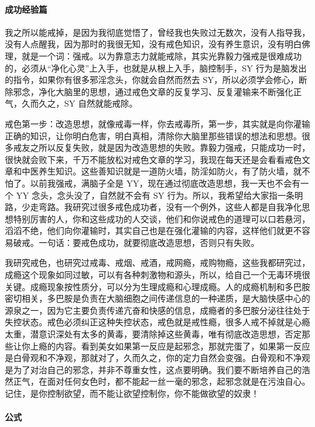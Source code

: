 \documentclass[fontset=founder]{ctexart}
\begin{document}
\paragraph{成功经验篇}

我之所以能戒掉，是因为我彻底觉悟了，曾经我也失败过无数次，没有人指导我，没有人点醒我，因为那时的我很无知，没有戒色知识，没有养生意识，没有明白佛理，就是一个词：强戒。以为靠意志力就能戒除，其实光靠毅力强戒是很难成功的，必须从“净化心灵”上入手，也就是从根上入手，脑控制手，SY 行为是脑发出的指令，如果你有很多邪淫念头，你就会自然而然去 SY，所以必须学会修心，断除邪念，净化大脑里的思想，通过戒色文章的反复学习、反复灌输来不断强化正气，久而久之，SY 自然就能戒除。

戒色第一步：改造思想，就像戒毒一样，你去戒毒所，第一步，其实就是向你灌输正确的知识，让你明白危害，明白真相，清除你大脑里那些错误的想法和思想。很多戒友之所以反复失败，就是因为改造思想的失败。靠毅力强戒，只能成功一时，很快就会败下来，千万不能放松对戒色文章的学习，我现在每天还是会看看戒色文章和中医养生知识。这些善知识就是一道防火墙，防淫如防火，有了防火墙，就不怕了。以前我强戒，满脑子全是 YY，现在通过彻底改造思想，我一天也不会有一个 YY 念头，念头没了，自然就不会有 SY 行为。所以，我希望给大家指一条明路，少走弯路。我研究过很多戒色成功者，没有一个例外，这些人都是自我净化思想特别厉害的人，你和这些成功的人交谈，他们和你说戒色的道理可以口若悬河，滔滔不绝，他们向你灌输时，其实自己也是在强化灌输的内容，这样他们就更不容易破戒。一句话：要戒色成功，就要彻底改造思想，否则只有失败。

我研究戒色，也研究过戒毒、戒烟、戒酒，戒网瘾，戒购物瘾，这些我都研究过，成瘾这个现象如同过敏，可以有各种刺激物和源头，所以，给自己一个无毒环境很关键。成瘾现象按性质分，可以分为生理成瘾和心理成瘾。人的成瘾机制和多巴胺密切相关，多巴胺是负责在大脑细胞之间传递信息的一种递质，是大脑快感中心的源泉之一，因为它主要负责传递亢奋和快感的信息，成瘾者的多巴胺分泌往往处于失控状态。戒色必须纠正这种失控状态，戒色就是戒性瘾，很多人戒不掉就是心瘾太重，潜意识深处有太多的黄毒，要清除掉这些黄毒，唯有彻底改造思想，否定那些让你上瘾的内容。看到美女如果第一反应是起邪念，那就完蛋了，如果第一反应是白骨观和不净观，那就对了，久而久之，你的定力自然会变强。白骨观和不净观是为了对治自己的邪念，并非不尊重女性，这点要明确。我们要不断培养自己的浩然正气，在面对任何女色时，都不能起一丝一毫的邪念，起邪念就是在污浊自心。记住，是你控制欲望，而不能让欲望控制你，你不能做欲望的奴隶！

\paragraph{公式}
\end{document}
